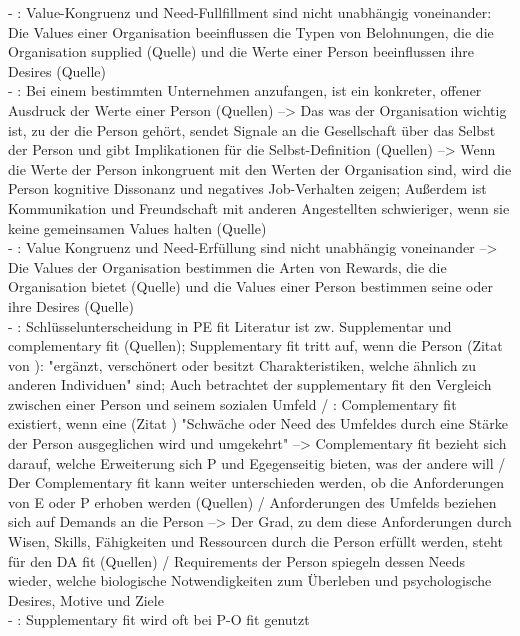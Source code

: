 - \cite[S. 3]{edwards:2004}: Value-Kongruenz und Need-Fullfillment sind nicht unabhängig voneinander: Die Values einer Organisation beeinflussen die Typen von Belohnungen, die die Organisation supplied (Quelle) und die Werte einer Person beeinflussen ihre Desires (Quelle) \\
- \cite[S. 3]{edwards:2004}: Bei einem bestimmten Unternehmen anzufangen, ist ein konkreter, offener Ausdruck der Werte einer Person (Quellen) --> Das was der Organisation wichtig ist, zu der die Person gehört, sendet Signale an die Gesellschaft über das Selbst der Person und gibt Implikationen für die Selbst-Definition (Quellen) --> Wenn die Werte der Person inkongruent mit den Werten der Organisation sind, wird die Person kognitive Dissonanz und negatives Job-Verhalten zeigen; Außerdem ist Kommunikation und Freundschaft mit anderen Angestellten schwieriger, wenn sie keine gemeinsamen Values halten (Quelle)\\
- \cite[S. 3]{edwards:2004}: Value Kongruenz und Need-Erfüllung sind nicht unabhängig voneinander --> Die Values der Organisation bestimmen die Arten von Rewards, die die Organisation bietet (Quelle) und die Values einer Person bestimmen seine oder ihre Desires (Quelle) \\
- \cite[S. 3]{edwards:2007}: Schlüsselunterscheidung in PE fit Literatur ist zw. Supplementar und complementary fit (Quellen); Supplementary fit tritt auf, wenn die Person (Zitat von \textcite[S. 269]{muchinsky:1987}): "ergänzt, verschönert oder besitzt Charakteristiken, welche ähnlich zu anderen Individuen" sind; Auch betrachtet der supplementary fit den Vergleich zwischen einer Person und seinem sozialen Umfeld / \cite[S. 4]{edwards:2007}: Complementary fit existiert, wenn eine (Zitat \cite[S. 271]{muchinsky:1987}) "Schwäche oder Need des Umfeldes durch eine Stärke der Person ausgeglichen wird und umgekehrt" --> Complementary fit bezieht sich darauf, welche Erweiterung sich P und Egegenseitig bieten, was der andere will / Der Complementary fit kann weiter unterschieden werden, ob die Anforderungen von E oder P erhoben werden (Quellen) / Anforderungen des Umfelds beziehen sich auf Demands an die Person --> Der Grad, zu dem diese Anforderungen durch Wisen, Skills, Fähigkeiten und Ressourcen durch die Person erfüllt werden, steht für den DA fit (Quellen) / Requirements der Person spiegeln dessen Needs wieder, welche biologische Notwendigkeiten zum Überleben und psychologische Desires, Motive und Ziele \cite{copingAndAdaption:1974} \\
- \cite[S. 6]{edwards:2007}: Supplementary fit wird oft bei P-O fit genutzt \\

